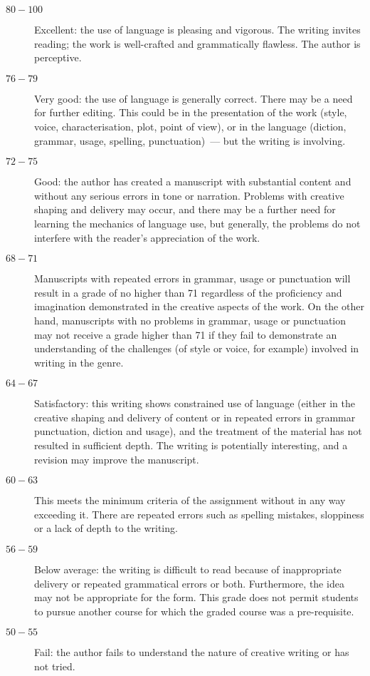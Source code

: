\documentclass[letterpaper,10pt,headsepline]{scrreprt}
\begin{document}
\begin{description}

\item[$80-100$] Excellent: the use of language is pleasing and
  vigorous. The writing invites reading; the work is well-crafted and
  grammatically flawless. The author is perceptive.

\item[$76-79$] Very good: the use of language is generally correct.
  There may be a need for further editing. This could be in the
  presentation of the work (style, voice, characterisation, plot,
  point of view), or in the language (diction, grammar, usage,
  spelling, punctuation)~--- but the writing is involving.

\item[$72-75$] Good: the author has created a manuscript with
  substantial content and without any serious errors in tone or
  narration. Problems with creative shaping and delivery may occur,
  and there may be a further need for learning the mechanics of
  language use, but generally, the problems do not interfere with the
  reader's appreciation of the work.

\item[$68-71$] Manuscripts with repeated errors in grammar, usage or
  punctuation will result in a grade of no higher than 71 regardless
  of the proficiency and imagination demonstrated in the creative
  aspects of the work. On the other hand, manuscripts with no problems
  in grammar, usage or punctuation may not receive a grade higher than
  71 if they fail to demonstrate an understanding of the challenges
  (of style or voice, for example) involved in writing in the genre.


\item[$64-67$] Satisfactory: this writing shows constrained use of language
  (either in the creative shaping and delivery of content or in
  repeated errors in grammar punctuation, diction and usage), and the
  treatment of the material has not resulted in sufficient depth. The
  writing is potentially interesting, and a revision may improve the
  manuscript.

\item[$60-63$] This meets the minimum criteria of the assignment
  without in any way exceeding it. There are repeated errors such as
  spelling mistakes, sloppiness or a lack of depth to the writing.

\item[$56-59$] Below average: the writing is difficult to read because
  of inappropriate delivery or repeated grammatical errors or both.
  Furthermore, the idea may not be appropriate for the form. This
  grade does not permit students to pursue another course for which
  the graded course was a pre-requisite.

\item[$50-55$] Fail: the author fails to understand the nature of
  creative writing or has not tried.

\end{description}
\end{document}
